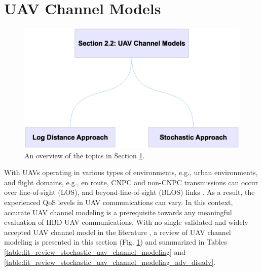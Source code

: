 
\section{UAV Channel Models} \label{lit_review_sec_uav_chn}

\begin{figure} [tpb]
\centering
\vspace{-1.5cm}
\includegraphics [width=0.8\columnwidth]{chap2_fig/sec_2_taxonomy.eps} 
\vspace{-2cm}
\caption{An overview of the topics in Section \ref{lit_review_sec_uav_chn}.}
\label{fig:lit_review_sec_2_taxonomy}
\end{figure}

With UAVs operating in various types of environments, e.g., urban environments, and flight domains, e.g., en route, CNPC and non-CNPC transmissions can occur over line-of-sight (LOS), and beyond-line-of-sight (BLOS) links \cite{kerczewski2012control}. As a result, the experienced QoS levels in UAV communications can vary. In this context, accurate UAV channel modeling is a prerequisite towards any meaningful evaluation of HBD UAV communications. With no single validated and widely accepted UAV channel model in the literature \cite{matolak2012air}, a review of UAV channel modeling is presented in this section (Fig. \ref{fig:lit_review_sec_2_taxonomy}) and summarized in Tables \ref{table:lit_review_stochastic_uav_channel_modeling} and \ref{table:lit_review_stochastic_uav_channel_modeling_adv_disadv}.

